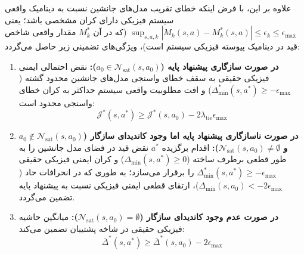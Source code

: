 \documentclass[oneside,openany,phd]{TMU-Thesis}
\begin{document}
\begin{proposition}
علاوه بر این، با فرض اینکه خطای تقریب مدل‌های جانشین نسبت به دینامیک واقعی سیستم فیزیکی دارای کران مشخصی باشد؛ یعنی $\sup_{s, a, k} |M_k(s, a) - M^*_k(s, a)| \le \epsilon_k \le \epsilon_{\max}$ (که در آن $M^*_k$ مقدار واقعی شاخص قید در دینامیک پیوسته فیزیکی سیستم است)، ویژگی‌های تضمینی زیر حاصل می‌گردد:
\begin{enumerate}
    \item \textbf{در صورت سازگاری پیشنهاد پایه ($a_0 \in \mathcal{N}_{\text{sat}}(s, a_0)$):} نقض احتمالی ایمنی فیزیکی حقیقی به سقف خطای واسنجی مدل‌های جانشین محدود گشته ($\Delta^*_{\min}(s, a^*) \ge -\epsilon_{\max}$) و افت مطلوبیت واقعی سیستم حداکثر به کران خطای واسنجی محدود است:
    \begin{equation}
    \mathcal{J}^*(s, a^*) \ge \mathcal{J}^*(s, a_0) - 2\lambda_{\text{tie}}\epsilon_{\max}
    \end{equation}
    \item \textbf{در صورت ناسازگاری پیشنهاد پایه اما وجود کاندیدای سازگار ($a_0 \notin \mathcal{N}_{\text{sat}}(s, a_0)$ و $\mathcal{N}_{\text{sat}}(s, a_0) \neq \emptyset$):} اقدام برگزیده $a^*$ نقض قید در فضای مدل جانشین را به طور قطعی برطرف ساخته ($\Delta_{\min}(s, a^*) \ge 0$) و کران ایمنی فیزیکی حقیقی $\Delta^*_{\min}(s, a^*) \ge -\epsilon_{\max}$ را برقرار می‌سازد؛ به طوری که در انحرافات حاد ($\Delta_{\min}(s, a_0) < -2\epsilon_{\max}$)، ارتقای قطعی ایمنی فیزیکی نسبت به پیشنهاد پایه تضمین می‌گردد.
    \item \textbf{در صورت عدم وجود کاندیدای سازگار ($\mathcal{N}_{\text{sat}}(s, a_0) = \emptyset$):} میانگین حاشیه فیزیکی حقیقی در شاخه پشتیبان تضمین می‌کند:
    \begin{equation}
    \bar{\Delta}^*(s, a^*) \ge \bar{\Delta}^*(s, a_0) - 2\epsilon_{\max}
    \end{equation}
\end{enumerate}
\end{proposition}
\end{document}
